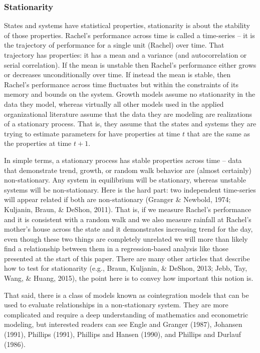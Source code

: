 \documentclass[english,,man]{apa6}
\begin{document}
\hypertarget{stationarity}{%
\subsubsection{Stationarity}\label{stationarity}}

States and systems have statistical properties, stationarity is about the stability of those properties. Rachel's performance across time is called a time-series -- it is the trajectory of performance for a single unit (Rachel) over time. That trajectory has properties: it has a mean and a variance (and autocorrelation or serial correlation). If the mean is unstable then Rachel's performance either grows or decreases unconditionally over time. If instead the mean is stable, then Rachel's performance across time fluctuates but within the constraints of its memory and bounds on the system. Growth models assume no stationarity in the data they model, whereas virtually all other models used in the applied organizational literature assume that the data they are modeling are realizations of a stationary process. That is, they assume that the states and systems they are trying to estimate parameters for have properties at time \(t\) that are the same as the properties at time \(t + 1\).

In simple terms, a stationary process has stable properties across time -- data that demonstrate trend, growth, or random walk behavior are (almost certainly) non-stationary. Any system in equilibrium will be stationary, whereas unstable systems will be non-stationary. Here is the hard part: two independent time-series will appear related if both are non-stationary (Granger \& Newbold, 1974; Kuljanin, Braun, \& DeShon, 2011). That is, if we measure Rachel's performance and it is consistent with a random walk and we also measure rainfall at Rachel's mother's house across the state and it demonstrates increasing trend for the day, even though these two things are completely unrelated we will more than likely find a relationship between them in a regression-based analysis like those presented at the start of this paper. There are many other articles that describe how to test for stationarity (e.g., Braun, Kuljanin, \& DeShon, 2013; Jebb, Tay, Wang, \& Huang, 2015), the point here is to convey how important this notion is.

That said, there is a class of models known as cointegration models that can be used to evaluate relationships in a non-stationary system. They are more complicated and require a deep understanding of mathematics and econometric modeling, but interested readers can see Engle and Granger (1987), Johansen (1991), Phillips (1991), Phillips and Hansen (1990), and Phillips and Durlauf (1986).
\end{document}
